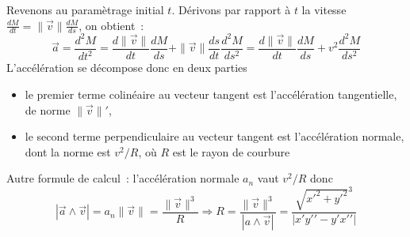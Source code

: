 \documentclass[a4paper,11pt]{article}
\begin{document}
Revenons au paramètrage initial $t$. Dérivons par rapport à $t$ la vitesse
$ \frac{dM}{dt} = \|\overrightarrow{v}\| \frac{dM}{ds}$, on obtient~:
$$ \overrightarrow{a}=\frac{d^2M}{dt^2}= \frac{d\|\overrightarrow{v}\|}{dt} \frac{dM}{ds} 
+ \|\overrightarrow{v}\| \frac{ds}{dt} \frac{d^2M}{ds^2}
= \frac{d\|\overrightarrow{v}\|}{dt} \frac{dM}{ds} + v^2 \frac{d^2M}{ds^2}$$
L'accélération se décompose donc en deux parties~
\begin{itemize}
\item  le premier
terme colinéaire au vecteur tangent est l'accélération 
tangentielle, 
de norme $\|\overrightarrow{v}\|'$, 
\item le second terme perpendiculaire au vecteur tangent
est l'accélération normale, 
dont la norme est $v^2/R$,
où $R$ est le rayon de courbure
\end{itemize}

Autre formule de calcul~: l'accélération normale $a_n$ vaut $v^2/R$ donc
$$ |\overrightarrow{a} \wedge \overrightarrow{v}|=
a_n \|\overrightarrow{v}\|=\frac{\|\overrightarrow{v}\|^3}{R} 
\Rightarrow R=\frac{\|\overrightarrow{v}\|^3}{|a \wedge \overrightarrow{v}|}
=\frac{\sqrt{x'^2+y'^2}^3}{|x'y'{'}-y'x'{'}|}
$$
\end{document}
